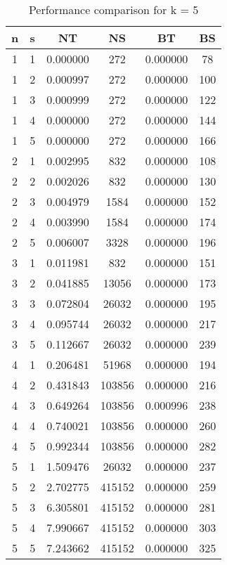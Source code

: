 \documentclass{article}
\begin{document}
    \begin{table}[ht]
    \centering
    \begin{tabular}{|c|c|c|c|c|c|}
    \hline
    n & s & NT & NS & BT & BS \\
    \hline
     1 & 1 & 0.000000 & 272 & 0.000000 & 78 \\ 
 1 & 2 & 0.000997 & 272 & 0.000000 & 100 \\ 
 1 & 3 & 0.000999 & 272 & 0.000000 & 122 \\ 
 1 & 4 & 0.000000 & 272 & 0.000000 & 144 \\ 
 1 & 5 & 0.000000 & 272 & 0.000000 & 166 \\ 
 2 & 1 & 0.002995 & 832 & 0.000000 & 108 \\ 
 2 & 2 & 0.002026 & 832 & 0.000000 & 130 \\ 
 2 & 3 & 0.004979 & 1584 & 0.000000 & 152 \\ 
 2 & 4 & 0.003990 & 1584 & 0.000000 & 174 \\ 
 2 & 5 & 0.006007 & 3328 & 0.000000 & 196 \\ 
 3 & 1 & 0.011981 & 832 & 0.000000 & 151 \\ 
 3 & 2 & 0.041885 & 13056 & 0.000000 & 173 \\ 
 3 & 3 & 0.072804 & 26032 & 0.000000 & 195 \\ 
 3 & 4 & 0.095744 & 26032 & 0.000000 & 217 \\ 
 3 & 5 & 0.112667 & 26032 & 0.000000 & 239 \\ 
 4 & 1 & 0.206481 & 51968 & 0.000000 & 194 \\ 
 4 & 2 & 0.431843 & 103856 & 0.000000 & 216 \\ 
 4 & 3 & 0.649264 & 103856 & 0.000996 & 238 \\ 
 4 & 4 & 0.740021 & 103856 & 0.000000 & 260 \\ 
 4 & 5 & 0.992344 & 103856 & 0.000000 & 282 \\ 
 5 & 1 & 1.509476 & 26032 & 0.000000 & 237 \\ 
 5 & 2 & 2.702775 & 415152 & 0.000000 & 259 \\ 
 5 & 3 & 6.305801 & 415152 & 0.000000 & 281 \\ 
 5 & 4 & 7.990667 & 415152 & 0.000000 & 303 \\ 
 5 & 5 & 7.243662 & 415152 & 0.000000 & 325 \\ 

    \hline
    \end{tabular}
    \caption{Performance comparison for k = 5}
    \end{table}
    
    
\end{document}
